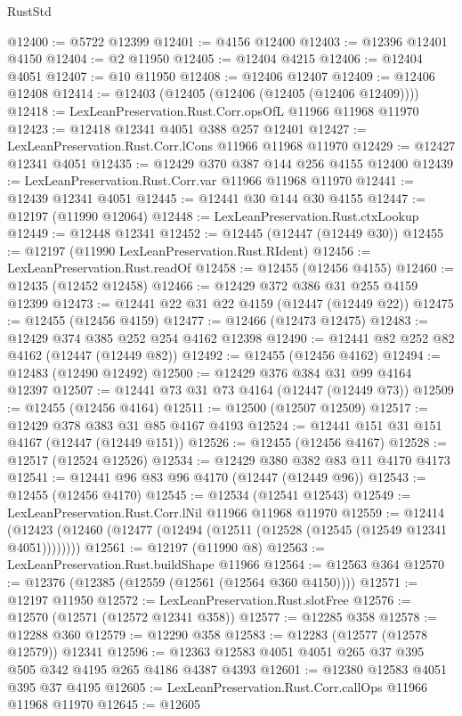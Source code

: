 \begin{lexlean}{RustStd}
\begin{coremodule}
@12400 := @5722 @12399
@12401 := @4156 @12400
@12403 := @12396 @12401 @4150
@12404 := @2 @11950
@12405 := @12404 @4215
@12406 := @12404 @4051
@12407 := @10 @11950
@12408 := @12406 @12407
@12409 := @12406 @12408
@12414 := @12403 (@12405 (@12406 (@12405 (@12406 @12409))))
@12418 := LexLeanPreservation.Rust.Corr.opsOfL @11966 @11968 @11970
@12423 := @12418 @12341 @4051 @388 @257 @12401
@12427 := LexLeanPreservation.Rust.Corr.lCons @11966 @11968 @11970
@12429 := @12427 @12341 @4051
@12435 := @12429 @370 @387 @144 @256 @4155 @12400
@12439 := LexLeanPreservation.Rust.Corr.var @11966 @11968 @11970
@12441 := @12439 @12341 @4051
@12445 := @12441 @30 @144 @30 @4155
@12447 := @12197 (@11990 @12064)
@12448 := LexLeanPreservation.Rust.ctxLookup
@12449 := @12448 @12341
@12452 := @12445 (@12447 (@12449 @30))
@12455 := @12197 (@11990 LexLeanPreservation.Rust.RIdent)
@12456 := LexLeanPreservation.Rust.readOf
@12458 := @12455 (@12456 @4155)
@12460 := @12435 (@12452 @12458)
@12466 := @12429 @372 @386 @31 @255 @4159 @12399
@12473 := @12441 @22 @31 @22 @4159 (@12447 (@12449 @22))
@12475 := @12455 (@12456 @4159)
@12477 := @12466 (@12473 @12475)
@12483 := @12429 @374 @385 @252 @254 @4162 @12398
@12490 := @12441 @82 @252 @82 @4162 (@12447 (@12449 @82))
@12492 := @12455 (@12456 @4162)
@12494 := @12483 (@12490 @12492)
@12500 := @12429 @376 @384 @31 @99 @4164 @12397
@12507 := @12441 @73 @31 @73 @4164 (@12447 (@12449 @73))
@12509 := @12455 (@12456 @4164)
@12511 := @12500 (@12507 @12509)
@12517 := @12429 @378 @383 @31 @85 @4167 @4193
@12524 := @12441 @151 @31 @151 @4167 (@12447 (@12449 @151))
@12526 := @12455 (@12456 @4167)
@12528 := @12517 (@12524 @12526)
@12534 := @12429 @380 @382 @83 @11 @4170 @4173
@12541 := @12441 @96 @83 @96 @4170 (@12447 (@12449 @96))
@12543 := @12455 (@12456 @4170)
@12545 := @12534 (@12541 @12543)
@12549 := LexLeanPreservation.Rust.Corr.lNil @11966 @11968 @11970
@12559 := @12414
    (@12423 (@12460 (@12477 (@12494 (@12511 (@12528 (@12545 (@12549 @12341 @4051))))))))
@12561 := @12197 (@11990 @8)
@12563 := LexLeanPreservation.Rust.buildShape @11966
@12564 := @12563 @364
@12570 := @12376 (@12385 (@12559 (@12561 (@12564 @360 @4150))))
@12571 := @12197 @11950
@12572 := LexLeanPreservation.Rust.slotFree
@12576 := @12570 (@12571 (@12572 @12341 @358))
@12577 := @12285 @358
@12578 := @12288 @360
@12579 := @12290 @358
@12583 := @12283 (@12577 (@12578 @12579)) @12341
@12596 := @12363 @12583 @4051 @4051 @265 @37 @395 @505 @342 @4195 @265 @4186 @4387 @4393
@12601 := @12380 @12583 @4051 @395 @37 @4195
@12605 := LexLeanPreservation.Rust.Corr.callOps @11966 @11968 @11970
@12645 := @12605

\end{coremodule}
\end{lexlean}
